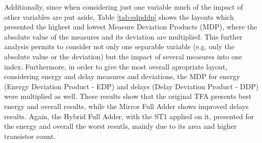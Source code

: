 \documentclass[pgmicro,mestrado,english]{iiufrgs}
\begin{document}
\begin{table}[]
\centering
\caption{Best and worst cases considering all metrics and the two types of operation considered in the experiments.}
\label{tab:overallFAs}
\end{table}

Additionally, since when considering just one variable much of the impact of other variables are put aside, Table \ref{tab:edpddp} shows the layouts which presented the highest and lowest Measure Deviation Products (MDP), where the absolute value of the measures and its deviation are multiplied. This further analysis permits to consider not only one separable variable (e.g. only the absolute value or the deviation) but the impact of several measures into one index. Furthermore, in order to give the most overall apropriate layout, considering energy and delay measures and deviations, the MDP for energy (Energy Deviation Product - EDP) and delays (Delay Deviation Product - DDP) were multiplied as well. These results show that the original TFA presents best energy and overall results, while the Mirror Full Adder shows improved delays results. Again, the Hybrid Full Adder, with the ST1 applied on it, presented for the energy and overall the worst resutls, mainly due to its area and higher transistor count.
\end{document}
